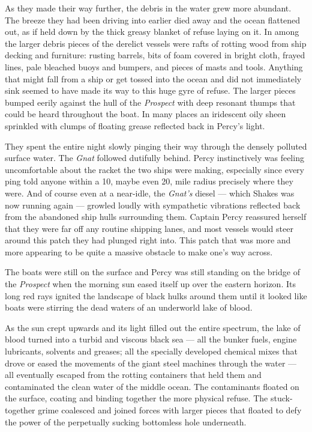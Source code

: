 \documentclass[
]{scrbook}
\begin{document}
As they made their way further, the debris in the water grew more
abundant. The breeze they had been driving into earlier died away and
the ocean flattened out, as if held down by the thick greasy blanket of
refuse laying on it. In among the larger debris pieces of the derelict
vessels were rafts of rotting wood from ship decking and furniture:
rusting barrels, bits of foam covered in bright cloth, frayed lines,
pale bleached buoys and bumpers, and pieces of masts and tools. Anything
that might fall from a ship or get tossed into the ocean and did not
immediately sink seemed to have made its way to this huge gyre of
refuse. The larger pieces bumped eerily against the hull of the
\emph{Prospect} with deep resonant thumps that could be heard throughout
the boat. In many places an iridescent oily sheen sprinkled with clumps
of floating grease reflected back in Percy's light.

They spent the entire night slowly pinging their way through the densely
polluted surface water. The \emph{Gnat} followed dutifully behind. Percy
instinctively was feeling uncomfortable about the racket the two ships
were making, especially since every ping told anyone within a 10, maybe
even 20, mile radius precisely where they were. And of course even at a
near-idle, the \emph{Gnat's} diesel --- which Shakes was now running
again --- growled loudly with sympathetic vibrations reflected back from
the abandoned ship hulls surrounding them. Captain Percy reassured
herself that they were far off any routine shipping lanes, and most
vessels would steer around this patch they had plunged right into. This
patch that was more and more appearing to be quite a massive obstacle to
make one's way across.

The boats were still on the surface and Percy was still standing on the
bridge of the \emph{Prospect} when the morning sun eased itself up over
the eastern horizon. Its long red rays ignited the landscape of black
hulks around them until it looked like boats were stirring the dead
waters of an underworld lake of blood.

As the sun crept upwards and its light filled out the entire spectrum,
the lake of blood turned into a turbid and viscous black sea --- all the
bunker fuels, engine lubricants, solvents and greases; all the specially
developed chemical mixes that drove or eased the movements of the giant
steel machines through the water --- all eventually escaped from the
rotting containers that held them and contaminated the clean water of
the middle ocean. The contaminants floated on the surface, coating and
binding together the more physical refuse. The stuck-together grime
coalesced and joined forces with larger pieces that floated to defy the
power of the perpetually sucking bottomless hole underneath.
\end{document}
